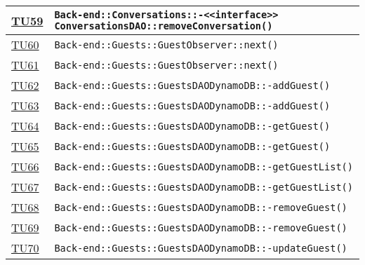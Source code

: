 \begin{longtable}{|>{\centering}m{1cm}|m{12cm}<{\centering}|}
\hyperlink{TU59}{TU59} & \texttt{Back-end::Conversations::-\linebreak <<interface>> ConversationsDAO::removeConversation()}\\ \hline

\hyperlink{TU60}{TU60} & \texttt{Back-end::Guests::GuestObserver::next()}\\ \hline

\hyperlink{TU61}{TU61} & \texttt{Back-end::Guests::GuestObserver::next()}\\ \hline

\hyperlink{TU62}{TU62} & \texttt{Back-end::Guests::GuestsDAODynamoDB::-\linebreak addGuest()}\\ \hline

\hyperlink{TU63}{TU63} & \texttt{Back-end::Guests::GuestsDAODynamoDB::-\linebreak addGuest()}\\ \hline

\hyperlink{TU64}{TU64} & \texttt{Back-end::Guests::GuestsDAODynamoDB::-\linebreak getGuest()}\\ \hline

\hyperlink{TU65}{TU65} & \texttt{Back-end::Guests::GuestsDAODynamoDB::-\linebreak getGuest()}\\ \hline

\hyperlink{TU66}{TU66} & \texttt{Back-end::Guests::GuestsDAODynamoDB::-\linebreak getGuestList()}\\ \hline

\hyperlink{TU67}{TU67} & \texttt{Back-end::Guests::GuestsDAODynamoDB::-\linebreak getGuestList()}\\ \hline

\hyperlink{TU68}{TU68} & \texttt{Back-end::Guests::GuestsDAODynamoDB::-\linebreak removeGuest()}\\ \hline

\hyperlink{TU69}{TU69} & \texttt{Back-end::Guests::GuestsDAODynamoDB::-\linebreak removeGuest()}\\ \hline

\hyperlink{TU70}{TU70} & \texttt{Back-end::Guests::GuestsDAODynamoDB::-\linebreak updateGuest()}\\ \hline


\end{longtable}
